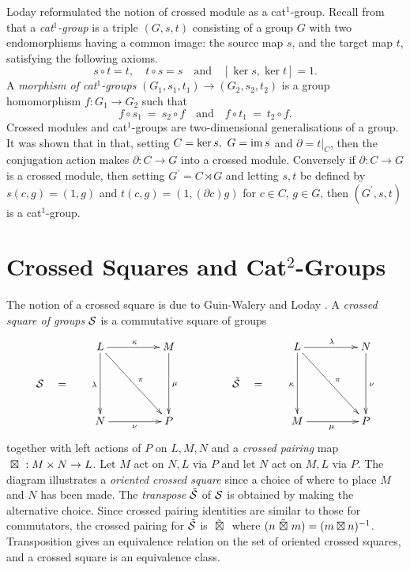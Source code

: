 \documentclass[a4paper,11pt]{article}
\theoremstyle{plain}
\theoremstyle{definition}
\begin{document}
Loday reformulated the notion of crossed module as a cat$^{1}$-group. 
Recall from \cite{Loday} that a \emph{cat$^{1}$-group} is a triple $(G,s,t)$ consisting of a group $G$ with two endomorphisms having a common image: 
the source map $s$, and the target map $t$, satisfying the following axioms. 
$$
s \circ t = t,\quad 
t \circ s = s \quad \mbox{and}\quad 
[\ker s,\ker t] = 1. 
$$
A \emph{morphism of cat}$^{1}$\emph{-groups} 
$(G_{1},s_1,t_1) \rightarrow (G_{2},s_2,t_2)$ 
is a group homomorphism $f : G_{1} \rightarrow G_{2}$ such that 
$$
f \circ s_1 ~=~ s_2 \circ f  
\quad\mbox{and}\quad 
f \circ t_1 ~=~ t_2 \circ f.
$$
Crossed modules and cat$^{1}$-groups are two-dimensional generalisations 
of a group. 
It was shown that in \cite[Lemma 2.2]{Loday} that, 
setting $C = \ker s,~ G = \mathrm{im}\, s$ and $\partial =t|_{C}$, 
then the conjugation action makes $\partial :C\rightarrow G$ into a crossed module. Conversely if $\partial : C \rightarrow G$ is a crossed module, 
then setting $G^{\prime} = C\rtimes G$
and letting $s,t$ be defined by $s(c,g) = (1,g)$ and $t(c,g) = (1,(\partial c)g)$
for $c\in C$, $g\in G$, then $(G^{\prime},s,t)$ is a cat$^{1}$-group.


\section{Crossed Squares and Cat$^{2}$-Groups}

The notion of a crossed square is due to Guin-Walery and Loday \cite{walery}. 
A \emph{crossed square of groups} $\mathcal{S}$ is a commutative square of groups 
\begin{equation} \label{xsq-diag}
\xymatrix@R=20pt@C=20pt
{     &  L \ar[dd]_{\lambda} \ar[rr]^{\kappa} \ar[ddrr]^{\pi} 
         &  & M \ar[dd]^{\mu} 
               &  &  &  L \ar[dd]_{\kappa} \ar[rr]^{\lambda} \ar[ddrr]^{\pi} 
                        &  &  N \ar[dd]^{\nu} \\
\calS \quad = 
      &  &  &  &  &  \tilde{\calS} \quad =  \\  
      &  N \ar[rr]_{\nu} 
         &  & P & &  &  M \ar[rr]_{\mu} 
                        &  &  P } 
\end{equation}
\noindent together with left actions of $P$ on $L,M,N$ 
and a \emph{crossed pairing} map ${\ \boxtimes\ } : M \times N \rightarrow L$. 
Let $M$ act on $N,L$ via $P$ and let $N$ act on $M,L$ via $P$. 
The diagram illustrates a \emph{oriented crossed square} since a choice 
of where to place $M$ and $N$ has been made. 
The \emph{transpose} $\tilde{\mathcal{S}}$ of $\mathcal{S}$ is obtained by making the alternative choice. 
Since crossed pairing identities are similar to those for commutators, 
the crossed pairing for $\tilde{\mathcal{S}}$ is $\ \tilde{\boxtimes}\ $ 
where $(n \ \tilde{\boxtimes}\  m) = (m \boxtimes n)^{-1}$. 
Transposition gives an equivalence relation on the set of 
oriented crossed squares, and a crossed square is an equivalence class. 
\end{document}
